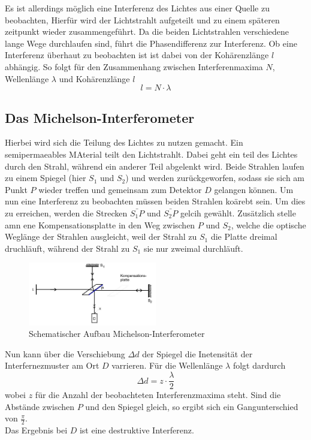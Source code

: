 Es ist allerdings möglich eine Interferenz des Lichtes aus einer Quelle zu beobachten, Hierfür wird
der Lichtstrahlt aufgeteilt und zu einem späteren zeitpunkt wieder zusammengeführt.
Da die beiden Lichtstrahlen verschiedene lange Wege durchlaufen sind, führt die Phasendifferenz zur Interferenz.
Ob eine Interferenz überhaut zu beobachten ist ist dabei von der Kohärenzlänge $l$ abhängig.
So folgt für den Zusammenhang zwischen Interferenmaxima $N$, Wellenlänge $\lambda$ 
und Kohärenzlänge $l$
\begin{equation}
    l=N\cdot\lambda \nonumber
\end{equation}

\subsection{Das Michelson-Interferometer}
Hierbei wird sich die Teilung des Lichtes zu nutzen gemacht. Ein semipermaeables MAterial teilt den Lichtstrahlt.
Dabei geht ein teil des Lichtes durch den Strahl, während ein anderer Teil abgelenkt wird.
Beide Strahlen laufen zu einem Spiegel (hier $S_1$ und $S_2$) und werden zurückgeworfen, sodass sie sich am Punkt $P$
wieder treffen und gemeinsam zum Detektor $D$ gelangen können.
Um nun eine Interferenz zu beobachten müssen beiden Strahlen koärebt sein.
Um dies zu erreichen, werden die Strecken $\bar{S_1P}$ und $\bar{S_2P}$ gelcih gewählt. Zusätzlich stelle amn ene Kompensationsplatte 
in den Weg zwischen $P$ und $S_2$, welche die optische Weglänge der Strahlen ausgleicht, weil der Strahl zu $S_1$ die Platte dreimal druchläuft,
während der Strahl zu $S_1$ sie nur zweimal durchläuft.\\
\begin{figure}
    \centering
    \includegraphics[width=0.5\textwidth]{bilder/s.jpg}
    \caption{Schematischer Aufbau Michelson-Interferometer \cite[9]{anleitung}}
\end{figure}
Nun kann über die Verschiebung $\Delta d$ der Spiegel die Inetensität der Interfernezmuster am Ort $D$
varrieren. Für die Wellenlänge $\lambda$ folgt dardurch
\begin{equation}
    \Delta d = z \cdot \frac{\lambda}{2} \label{eqn:Wellenlaenge}
\end{equation}
wobei $z$ für die Anzahl der beobachteten Interferenzmaxima steht.
Sind die Abstände zwischen $P$ und den Spiegel gleich, so ergibt sich ein Gangunterschied von $\frac{\pi}{2}$.\\
Das Ergebnis bei $D$ ist eine destruktive Interferenz.


